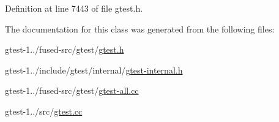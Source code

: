 \-Definition at line 7443 of file gtest.\-h.



\-The documentation for this class was generated from the following files\-:\begin{DoxyCompactItemize}
\item 
gtest-\/1../fused-\/src/gtest/\hyperlink{fused-src_2gtest_2gtest_8h}{gtest.\-h}\item 
gtest-\/1../include/gtest/internal/\hyperlink{gtest-internal_8h}{gtest-\/internal.\-h}\item 
gtest-\/1../fused-\/src/gtest/\hyperlink{fused-src_2gtest_2gtest-all_8cc}{gtest-\/all.\-cc}\item 
gtest-\/1../src/\hyperlink{gtest_8cc}{gtest.\-cc}\end{DoxyCompactItemize}
